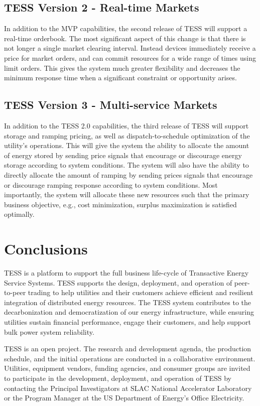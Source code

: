 \subsection{TESS Version 2 - Real-time Markets}

In addition to the MVP capabilities, the second release of TESS will support a real-time orderbook. The most significant aspect of this change is that there is not longer a single market clearing interval. Instead devices immediately receive a price for market orders, and can commit resources for a wide range of times using limit orders. This gives the system much greater flexibility and decreases the minimum response time when a significant constraint or opportunity arises.

\subsection{TESS Version 3 - Multi-service Markets}

In addition to the TESS 2.0 capabilities, the third release of TESS will support storage and ramping pricing, as well as dispatch-to-schedule optimization of the utility's operations. This will give the system the ability to allocate the amount of energy stored by sending price signals that encourage or discourage energy storage according to system conditions.  The system will also have the ability to directly allocate the amount of ramping by sending prices signals that encourage or discourage ramping response according to system conditions.  Most importantly, the system will allocate these new resources such that the primary business objective, e.g., cost minimization, surplus maximization is satisfied optimally.

\section{Conclusions}

TESS is a platform to support the full business life-cycle of Transactive Energy Service Systems.  TESS supports the design, deployment, and operation of peer-to-peer trading to help utilities and their customers achieve efficient and resilient integration of distributed energy resources.  The TESS system contributes to the decarbonization and democratization of our energy infrastructure, while ensuring utilities sustain financial performance, engage their customers, and help support bulk power system reliability.

TESS is an open project. The research and development agenda, the production schedule, and the initial operations are conducted in a collaborative environment. Utilities, equipment vendors, funding agencies, and consumer groups are invited to participate in the development, deployment, and operation of TESS by contacting the Principal Investigators at SLAC National Accelerator Laboratory or the Program Manager at the US Department of Energy's Office Electricity.